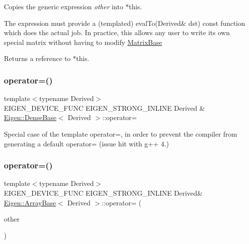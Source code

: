 Copies the generic expression {\itshape other} into $\ast$this. 

The expression must provide a (templated) eval\+To(\+Derived\& dst) const function which does the actual job. In practice, this allows any user to write its own special matrix without having to modify \mbox{\hyperlink{class_eigen_1_1_matrix_base}{Matrix\+Base}}

\begin{DoxyReturn}{Returns}
a reference to $\ast$this. 
\end{DoxyReturn}
\mbox{\label{class_eigen_1_1_array_base_aae79d5d0d95e60bf2e64d0dc3dfd66a4}} 
\subsubsection{\texorpdfstring{operator=()}{operator=()}\hspace{0.1cm}{\footnotesize\ttfamily [3/5]}}
{\footnotesize\ttfamily template$<$typename Derived$>$ \\
E\+I\+G\+E\+N\+\_\+\+D\+E\+V\+I\+C\+E\+\_\+\+F\+U\+NC E\+I\+G\+E\+N\+\_\+\+S\+T\+R\+O\+N\+G\+\_\+\+I\+N\+L\+I\+NE Derived \& \mbox{\hyperlink{class_eigen_1_1_dense_base}{Eigen\+::\+Dense\+Base}}$<$ Derived $>$\+::operator=}

Special case of the template operator=, in order to prevent the compiler from generating a default operator= (issue hit with g++ 4.) \mbox{\label{class_eigen_1_1_array_base_a72f5fe3d0805810e65eb897ccd3b6760}} 
\subsubsection{\texorpdfstring{operator=()}{operator=()}\hspace{0.1cm}{\footnotesize\ttfamily [4/5]}}
{\footnotesize\ttfamily template$<$typename Derived$>$ \\
E\+I\+G\+E\+N\+\_\+\+D\+E\+V\+I\+C\+E\+\_\+\+F\+U\+NC E\+I\+G\+E\+N\+\_\+\+S\+T\+R\+O\+N\+G\+\_\+\+I\+N\+L\+I\+NE Derived\& \mbox{\hyperlink{class_eigen_1_1_array_base}{Eigen\+::\+Array\+Base}}$<$ Derived $>$\+::operator= (\begin{DoxyParamCaption}\item[{const \mbox{\hyperlink{class_eigen_1_1_array_base}{Array\+Base}}$<$ Derived $>$ \&}]{other }\end{DoxyParamCaption})\hspace{0.3cm}{\ttfamily [inline]}}

